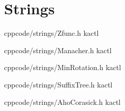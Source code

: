 \chapter{Strings}

{}{}
{cpp}{code/strings/Zfunc.h}
{kactl}

{}{}
{cpp}{code/strings/Manacher.h}
{kactl}

{}{}
{cpp}{code/strings/MinRotation.h}
{kactl}

{}{}
{cpp}{code/strings/SuffixTree.h}
{kactl}

{}{}
{cpp}{code/strings/AhoCorasick.h}
{kactl}
